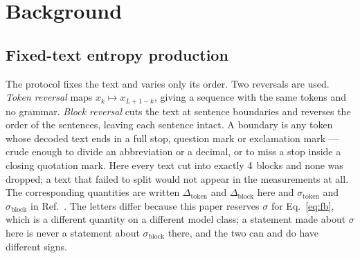 \documentclass[11pt]{article}
\newcommand{\Dblock}{\Delta_{\mathrm{block}}}
\newcommand{\Dtok}{\Delta_{\mathrm{token}}}
\begin{document}
\begin{abstract}
The question the thermodynamic reading poses is whether a fixed text has an
entropy production: a number that is a property of the text and has a zero.
Neither quantity answers it, and for different reasons.  $\Delta$ reverses the text, which moves to another point
of the same law and leaves a fixed text without an origin.  That much
follows from the structure of the theorems and needs no measurement.  What
the measurement adds is that what $\Delta$ does separate is mostly the order
the passage was produced in.  $\sigma$ reverses
the order in which the model assembles the text, with the text
held fixed, and Eq.~\eqref{eq:fbzero} gives that an origin, so its value
reports the evaluator's incompatibility rather than the text; that too
follows from the identity, before anything is measured.  What survives is the permutation set --- a reference configuration
supplied by an \emph{antisymmetry} rather than by a theorem --- and the
identity that makes $\sigma$ vanish wherever the conditionals derive from a
joint.
\end{abstract}



\section{Background}

\subsection{Fixed-text entropy production}
\label{sec:fixedtext}
The protocol fixes the text and varies only its order.  Two reversals are used.
\emph{Token reversal} maps $x_k \mapsto x_{L+1-k}$, giving a sequence with the
same tokens and no grammar.  \emph{Block reversal} cuts the text at sentence
boundaries and reverses the order of the sentences, leaving each sentence
intact.  A boundary is any token whose decoded text ends in a
full stop, question mark or exclamation mark --- crude enough to divide an
abbreviation or a decimal, or to miss a stop inside a closing quotation mark.
Here every text cut into exactly $4$ blocks and none was dropped; a
text that failed to split would not appear in the measurements at all.  The corresponding quantities
are written $\Dtok$ and $\Dblock$ here and $\sigma_{\mathrm{token}}$ and
$\sigma_{\mathrm{block}}$ in Ref.~\cite{sagawa2026}.  The letters differ
because this paper reserves $\sigma$ for Eq.~\eqref{eq:fb}, which is a
different quantity on a different model class; a statement made about
$\sigma$ here is never a statement about $\sigma_{\mathrm{block}}$ there,
and the two can and do have different signs.
\end{document}
